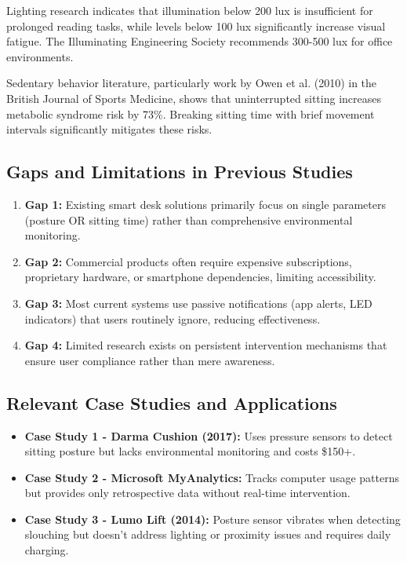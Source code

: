 \documentclass[12pt,a4paper]{article}
\begin{document}
Lighting research indicates that illumination below 200 lux is insufficient for prolonged reading tasks, while levels below 100 lux significantly increase visual fatigue. The Illuminating Engineering Society recommends 300-500 lux for office environments.

Sedentary behavior literature, particularly work by Owen et al. (2010) in the British Journal of Sports Medicine, shows that uninterrupted sitting increases metabolic syndrome risk by 73\%. Breaking sitting time with brief movement intervals significantly mitigates these risks.

\subsection{Gaps and Limitations in Previous Studies}

\begin{enumerate}
\item \textbf{Gap 1:} Existing smart desk solutions primarily focus on single parameters (posture OR sitting time) rather than comprehensive environmental monitoring.

\item \textbf{Gap 2:} Commercial products often require expensive subscriptions, proprietary hardware, or smartphone dependencies, limiting accessibility.

\item \textbf{Gap 3:} Most current systems use passive notifications (app alerts, LED indicators) that users routinely ignore, reducing effectiveness.

\item \textbf{Gap 4:} Limited research exists on persistent intervention mechanisms that ensure user compliance rather than mere awareness.
\end{enumerate}

\subsection{Relevant Case Studies and Applications}

\begin{itemize}
\item \textbf{Case Study 1 - Darma Cushion (2017):} Uses pressure sensors to detect sitting posture but lacks environmental monitoring and costs \$150+.

\item \textbf{Case Study 2 - Microsoft MyAnalytics:} Tracks computer usage patterns but provides only retrospective data without real-time intervention.

\item \textbf{Case Study 3 - Lumo Lift (2014):} Posture sensor vibrates when detecting slouching but doesn't address lighting or proximity issues and requires daily charging.
\end{itemize}
\end{document}
